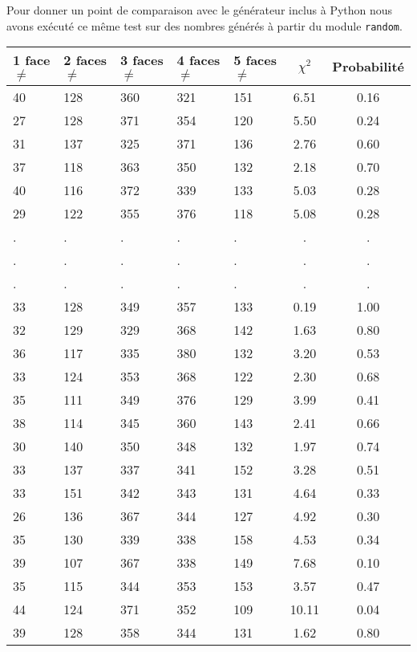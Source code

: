\documentclass[12pt,a4paper]{article}
\begin{document}
\newpage
Pour donner un point de comparaison avec le générateur inclus à Python nous avons
exécuté ce même test sur des nombres générés à partir du module \texttt{random}.

\begin{center}
\begin{tabular}{|l|l|l|l|l|c|c|}
\hline
1 face $\neq$ & 2 faces $\neq$  & 3 faces $\neq$ & 4 faces $\neq$ & 5 faces $\neq$ & $\chi^2$ & Probabilité \\
\hline \hline
40 & 128 & 360 & 321 & 151 &  6.51 &  0.16\\ \hline
27 & 128 & 371 & 354 & 120 &  5.50 &  0.24\\ \hline
31 & 137 & 325 & 371 & 136 &  2.76 &  0.60\\ \hline
37 & 118 & 363 & 350 & 132 &  2.18 &  0.70\\ \hline
40 & 116 & 372 & 339 & 133 &  5.03 &  0.28\\ \hline
29 & 122 & 355 & 376 & 118 &  5.08 &  0.28\\ \hline
 . & . & . & . & . & . & . \\ \hline
 . & . & . & . & . & . & . \\ \hline
 . & . & . & . & . & . & . \\ \hline
33 & 128 & 349 & 357 & 133 &  0.19 &  1.00\\ \hline
32 & 129 & 329 & 368 & 142 &  1.63 &  0.80\\ \hline
36 & 117 & 335 & 380 & 132 &  3.20 &  0.53\\ \hline
33 & 124 & 353 & 368 & 122 &  2.30 &  0.68\\ \hline
35 & 111 & 349 & 376 & 129 &  3.99 &  0.41\\ \hline
38 & 114 & 345 & 360 & 143 &  2.41 &  0.66\\ \hline
30 & 140 & 350 & 348 & 132 &  1.97 &  0.74\\ \hline
33 & 137 & 337 & 341 & 152 &  3.28 &  0.51\\ \hline
33 & 151 & 342 & 343 & 131 &  4.64 &  0.33\\ \hline
26 & 136 & 367 & 344 & 127 &  4.92 &  0.30\\ \hline
35 & 130 & 339 & 338 & 158 &  4.53 &  0.34\\ \hline
39 & 107 & 367 & 338 & 149 &  7.68 &  0.10\\ \hline
35 & 115 & 344 & 353 & 153 &  3.57 &  0.47\\ \hline
44 & 124 & 371 & 352 & 109 & 10.11 &  0.04\\ \hline
39 & 128 & 358 & 344 & 131 &  1.62 &  0.80\\ \hline

\end{tabular}
\end{center}
\end{document}
